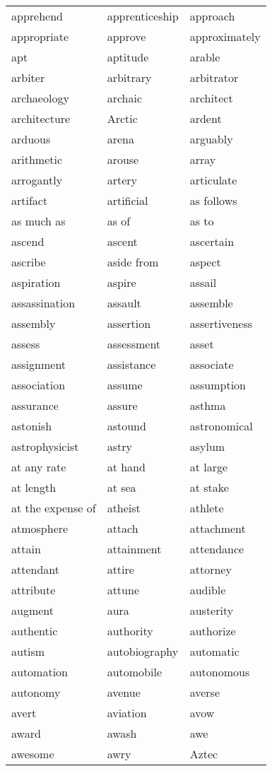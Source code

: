 \documentclass{minimal}
\begin{document}
\begin{longtable}{p{2.8cm}p{2.8cm}p{2.8cm}}
apprehend & apprenticeship & approach \\
appropriate & approve & approximately \\
apt & aptitude & arable \\
arbiter & arbitrary & arbitrator \\
archaeology & archaic & architect \\
architecture & Arctic & ardent \\
arduous & arena & arguably \\
arithmetic & arouse & array \\
arrogantly & artery & articulate \\
artifact & artificial & as follows \\
as much as & as of & as to \\
ascend & ascent & ascertain \\
ascribe & aside from & aspect \\
aspiration & aspire & assail \\
assassination & assault & assemble \\
assembly & assertion & assertiveness \\
assess & assessment & asset \\
assignment & assistance & associate \\
association & assume & assumption \\
assurance & assure & asthma \\
astonish & astound & astronomical \\
astrophysicist & astry & asylum \\
at any rate & at hand & at large \\
at length & at sea & at stake \\
at the expense of & atheist & athlete \\
atmosphere & attach & attachment \\
attain & attainment & attendance \\
attendant & attire & attorney \\
attribute & attune & audible \\
augment & aura & austerity \\
authentic & authority & authorize \\
autism & autobiography & automatic \\
automation & automobile & autonomous \\
autonomy & avenue & averse \\
avert & aviation & avow \\
award & awash & awe \\
awesome & awry & Aztec
\end{longtable}
\end{document}
